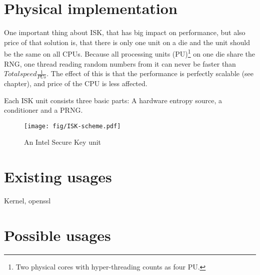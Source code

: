 \section{Physical implementation}
One important thing about ISK, that has big impact on performance, but also price of that solution is, that there is only one unit on a die and the unit should be the same on all CPUs. %
Because all processing units (PU)\footnote{Two physical cores with hyper-threading counts as four PU.} on one die share the RNG, one thread reading random numbers from it can never be faster than $Total speed  \frac{1}{PUs}$. The effect of this is that the performance is perfectly scalable (see  chapter), and price of the CPU is less affected.

Each ISK unit consists three basic parts: A hardware entropy source, a conditioner and a PRNG\cite{IntelDRNGGuide}.
\begin{figure}[h!]
  \centering
 \texttt{[image: fig/ISK-scheme.pdf]} %
\caption{An Intel Secure Key unit}
\label{fig:ISK-unit}
\end{figure}

\section{Existing usages} 
Kernel, openssl
\section{Possible usages}

